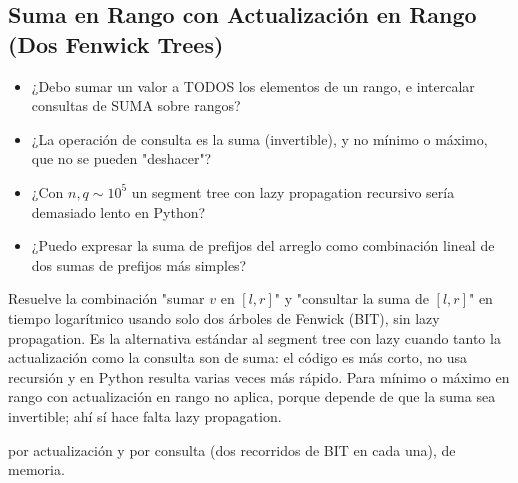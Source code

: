 \subsection{Suma en Rango con Actualización en Rango (Dos Fenwick Trees)}
\label{alg:3-5}


\begin{itemize}
\item ¿Debo sumar un valor a TODOS los elementos de un rango, e intercalar consultas de SUMA sobre rangos?
\item ¿La operación de consulta es la suma (invertible), y no mínimo o máximo, que no se pueden "deshacer"?
\item ¿Con $n, q \sim 10^5$ un segment tree con lazy propagation recursivo sería demasiado lento en Python?
\item ¿Puedo expresar la suma de prefijos del arreglo como combinación lineal de dos sumas de prefijos más simples?
\end{itemize}

 Resuelve la combinación "sumar $v$ en $[l, r]$" y "consultar la suma de $[l, r]$" en tiempo logarítmico usando solo dos árboles de Fenwick (BIT), sin lazy propagation. Es la alternativa estándar al segment tree con lazy cuando tanto la actualización como la consulta son de suma: el código es más corto, no usa recursión y en Python resulta varias veces más rápido. Para mínimo o máximo en rango con actualización en rango no aplica, porque depende de que la suma sea invertible; ahí sí hace falta lazy propagation.

  por actualización y por consulta (dos recorridos de BIT en cada una),  de memoria.

